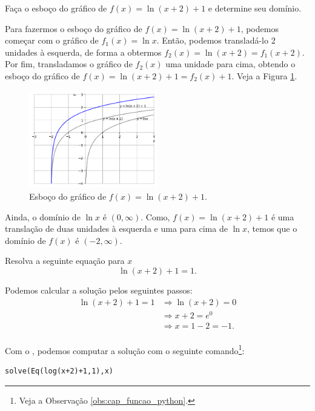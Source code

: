 \begin{exeresol}
  Faça o esboço do gráfico de $f(x) = \ln(x+2)+1$ e determine seu domínio.
\end{exeresol}
\begin{resol}
  Para fazermos o esboço do gráfico de $f(x) = \ln(x+2)+1$, podemos começar com o gráfico de $f_1(x) = \ln x$. Então, podemos transladá-lo 2 unidades à esquerda, de forma a obtermos $f_2(x) = \ln(x+2) = f_1(x+2)$. Por fim, transladamos o gráfico de $f_2(x)$ uma unidade para cima, obtendo o esboço do gráfico de $f(x) = \ln(x+2)+1=f_2(x)+1$. Veja a Figura \ref{fig:exeresol_lograf}.

  \begin{figure}[H]
    \centering
    \includegraphics[width=0.5\textwidth]{./cap_funcao/dados/fig_exeresol_lograf/fig_exeresol_lograf}
    \caption{Esboço do gráfico de $f(x) = \ln(x+2)+1$.}
    \label{fig:exeresol_lograf}
  \end{figure}

Ainda, o domínio de $\ln x$ é $(0, \infty)$. Como, $f(x) = \ln(x+2)+1$ é uma translação de duas unidades à esquerda e uma para cima de $\ln x$, temos que o domínio de $f(x)$ é $(-2, \infty)$.
\end{resol}

\begin{exeresol}
  Resolva a seguinte equação para $x$
  \begin{equation}
    \ln(x+2) + 1 = 1. 
  \end{equation}
\end{exeresol}
\begin{resol}
  Podemos calcular a solução pelos seguintes passos:
  \begin{align}
    \ln(x+2)+1=1 &\Rightarrow \ln(x+2)=0\\
                 &\Rightarrow x+2=e^0\\
                 &\Rightarrow x=1-2=-1.\\
  \end{align}

  \ifispython
  Com o \sympy, podemos computar a solução com o seguinte comando\footnote{Veja a Observação \ref{obs:cap_funcao_python}.}:
\begin{verbatim}
solve(Eq(log(x+2)+1,1),x)
\end{verbatim}
  \fi
\end{resol}

